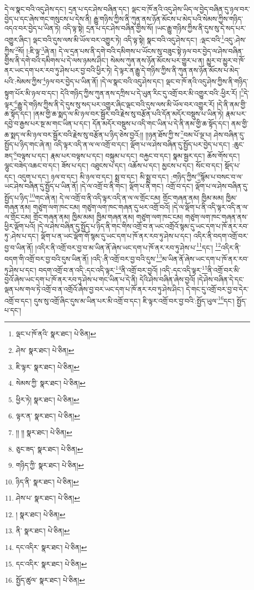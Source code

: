 དེ་ལ་སྣང་བའི་འདུ་ཤེས་དང་། དྲན་པ་དང་ཤེས་བཞིན་དང་། ལྡང་བ་ཁོ་ནའི་འདུ་ཤེས་ཡིད་ལ་བྱེད་བཞིན་དུ་ཉལ་བར་བྱེད་པ་དང་ཞེས་གང་གསུངས་པ་དེས་ནི། རྒྱུ་གཉིས་ཀྱིས་ནི་ཀུན་ནས་ཉོན་མོངས་པ་མེད་པའི་སེམས་ཀྱིས་གཉིད་འདའ་བར་བྱེད་པ་ཡིན་ཏེ། འདི་ལྟ་སྟེ། དྲན་པ་དང་ཤེས་བཞིན་གྱིས་སོ། །ཡང་རྒྱུ་གཉིས་ཀྱིས་ནི་དུས་སུ་དེ་སད་པར་འགྱུར་ཞིང་། ལྡང་བའི་དུས་ལས་མི་ཡོལ་བར་འགྱུར་ཏེ། འདི་ལྟ་སྟེ། སྣང་བའི་འདུ་ཤེས་དང་། :ལྡང་བའི་\footnote{ལྡང་པ་ཁོ་ནའི་  སྣར་ཐང་།  པེ་ཅིན། }འདུ་:ཤེས་ཀྱིས་\footnote{ཤེས་  སྣར་ཐང་།  པེ་ཅིན། }སོ། །:ཇི་ལྟ་\footnote{ཇི་ལྟར་  སྣར་ཐང་།  པེ་ཅིན། }ཞེ་ན། དེ་ལ་དྲན་པས་ནི་དགེ་བའི་དམིགས་པ་ཡོངས་སུ་བཟུང་སྟེ་ཉལ་བར་བྱེད་ལ་ཤེས་བཞིན་གྱིས་ནི་དགེ་བའི་དམིགས་པ་དེ་ལས་ཉམས་ཤིང་། སེམས་ཀུན་ནས་ཉོན་མོངས་པར་གྱུར་པ་ན། མྱུར་བ་མྱུར་བ་ཁོ་ནར་ཡང་དག་པར་རབ་ཏུ་ཤེས་པར་བྱ་བའི་ཕྱིར་ཏེ། དེ་ལྟར་ན་རྒྱུ་དེ་གཉིས་ཀྱིས་ནི་ཀུན་ནས་ཉོན་མོངས་པ་མེད་པའི་:སེམས་ཀྱིས་\footnote{སེམས་ཀྱི་  སྣར་ཐང་།  པེ་ཅིན། }ཉལ་བར་བྱེད་པ་ཡིན་ནོ། །དེ་ལ་སྣང་བའི་འདུ་ཤེས་དང་། ལྡང་བ་ཁོ་ནའི་འདུ་ཤེས་ཀྱིས་ནི་གཉིད་སྟུག་པོར་མི་ཉལ་བ་དང་། དེའི་གཉིད་ཀྱིས་ཀུན་ནས་དཀྲིས་པ་དེ་ཡུན་རིང་དུ་འགྲོ་བར་མི་འགྱུར་བའི་:ཕྱིར་རོ། །\footnote{ཕྱིར་ཏེ།   སྣར་ཐང་།  པེ་ཅིན། }དེ་ལྟར་\footnote{ལྟར་ན་  སྣར་ཐང་།  པེ་ཅིན། }རྒྱུ་དེ་གཉིས་ཀྱིས་ནི་དེ་དུས་སུ་སད་པར་འགྱུར་ཞིང་ལྡང་བའི་དུས་ལས་མི་ཡོལ་བར་འགྱུར་རོ། །དེ་ནི་ནམ་གྱི་ཆ་སྟོད་དང་། །ནམ་གྱི་ཆ་སྨད་ལ་མི་ཉལ་བར་སྦྱོར་བའི་རྗེས་སུ་བརྩོན་པའི་དོན་མདོར་བསྡུས་པ་ཡིན་ཏེ། རྣམ་པར་དབྱེ་བ་རྒྱས་པར་སྔ་མ་གང་ཡིན་པ་དང་། དོན་མདོར་བསྡུས་པ་འདི་གང་ཡིན་པ་དེ་ནི་ནམ་གྱི་ཆ་སྟོད་དང་། ནམ་གྱི་ཆ་སྨད་ལ་མི་ཉལ་བར་སྦྱོར་བའི་རྗེས་སུ་བརྩོན་པ་ཉིད་ཅེས་བྱའོ:།། །།ཉན་ཐོས་ཀྱི་ས་\footnote{།། །།  སྣར་ཐང་།  པེ་ཅིན། }བམ་པོ་ལྔ་པ། ཤེས་བཞིན་དུ་སྤྱོད་པ་ཉིད་གང་ཞེ་ན། འདི་ལྟར་འདི་ན་ལ་ལ་འགྲོ་བ་དང་། ལྡོག་པ་ལ་ཤེས་བཞིན་དུ་སྤྱོད་པར་བྱེད་པ་དང་། :ཆུང་ཟད་\footnote{ཅུང་ཟད་  སྣར་ཐང་།  པེ་ཅིན། }བལྟས་པ་དང་། རྣམ་པར་བལྟས་པ་དང་། བསྐུམ་པ་དང་། བརྐྱང་བ་དང་། སྣམ་སྦྱར་དང་། ཆོས་གོས་དང་། ལྷུང་བཟེད་འཆང་བ་དང་། ཟོས་པ་དང་། འཐུངས་པ་དང་། འཆོས་པ་དང་། མྱངས་པ་དང་། སོང་བ་དང་། སྡོད་པ་དང་། འདུག་པ་དང་། ཉལ་བ་དང་། མི་ཉལ་བ་དང་། སྨྲ་བ་དང་། མི་སྨྲ་བ་དང་། :གཉིད་ཀྱིས་\footnote{གཉིད་ཀྱི་  སྣར་ཐང་།  པེ་ཅིན། }སྙོམ་པ་བསང་བ་ལ་ཡང་ཤེས་བཞིན་དུ་སྤྱོད་པ་ཡིན་ནོ། །དེ་ལ་འགྲོ་བ་ནི་གང་། ལྡོག་པ་ནི་གང་། འགྲོ་བ་དང་། ལྡོག་པ་ལ་ཤེས་བཞིན་དུ་སྤྱོད་པ་ཉིད་\footnote{ཉིད་ནི་  སྣར་ཐང་།  པེ་ཅིན། }གང་ཞེ་ན། དེ་ལ་འགྲོ་བ་ནི་འདི་ལྟར་འདི་ན་ལ་ལ་གྲོང་ངམ། གྲོང་གཞན་ནམ། ཁྱིམ་མམ། ཁྱིམ་གཞན་ནམ། གཙུག་ལག་ཁང་ངམ། གཙུག་ལག་ཁང་གཞན་དུ་ཕར་འགྲོ་བའོ། །དེ་ལ་ལྡོག་པ་ནི་འདི་ལྟར་འདི་ན་ལ་ལ་གྲོང་ངམ། གྲོང་གཞན་ནམ། ཁྱིམ་མམ། ཁྱིམ་གཞན་ནམ། གཙུག་ལག་ཁང་ངམ། གཙུག་ལག་ཁང་གཞན་ནས་ཕྱིར་ལྡོག་པའོ། །དེ་ལ་ཤེས་བཞིན་དུ་སྤྱོད་པ་ཉིད་ནི་གང་གིས་འགྲོ་བ་ན་ཡང་འགྲོའོ་སྙམ་དུ་ཡང་དག་པ་ཁོ་ནར་རབ་ཏུ་:ཤེས་པ་དང་། ལྡོག་པ་ན་ཡང་ལྡོག་གོ་སྙམ་དུ་ཡང་དག་པ་ཁོ་ནར་རབ་ཏུ་ཤེས་པ་དང་། འདིར་ནི་བདག་འགྲོ་བར་བྱ་བ་ཡིན་ནོ། །འདིར་ནི་འགྲོ་བར་བྱ་བ་མ་ཡིན་ནོ་ཞེས་ཡང་དག་པ་ཁོ་ནར་རབ་ཏུ་ཤེས་པ་\footnote{ཤེས་པ་  སྣར་ཐང་།  པེ་ཅིན། }དང་། \footnote{།    སྣར་ཐང་།  པེ་ཅིན། }འདིར་ནི་བདག་གི་འགྲོ་བར་བྱ་བའི་དུས་ཡིན་ནོ། །འདི་:ནི་འགྲོ་བར་བྱ་བའི་དུས་\footnote{ནི་  སྣར་ཐང་།  པེ་ཅིན། }མ་ཡིན་ནོ་ཞེས་ཡང་དག་པ་ཁོ་ནར་རབ་ཏུ་ཤེས་པ་དང་། བདག་འགྲོ་བ་ན་འདི་:དང་འདི་ལྟར་\footnote{དང་འདིར་  སྣར་ཐང་།  པེ་ཅིན། }ནི་འགྲོ་བར་བྱའོ། །འདི་:དང་འདི་ལྟར་\footnote{དང་འདིར་  སྣར་ཐང་།  པེ་ཅིན། }ནི་འགྲོ་བར་མི་བྱའོ་ཞེས་ཡང་དག་པ་ཁོ་ནར་རབ་ཏུ་ཤེས་པ་གང་ཡིན་པ་དེ་ནི། དེའི་ཤེས་བཞིན་ཞེས་བྱའོ། །དེ་ཤེས་བཞིན་དེ་དང་ལྡན་པས་གལ་ཏེ་འགྲོ་བ་ན་འགྲོའོ་ཞེས་བྱ་བར་ཡང་དག་པ་ཁོ་ནར་རབ་ཏུ་ཤེས་ཤིང་། དེ་གང་དུ་འགྲོ་བར་བྱ་བ་དེར་འགྲོ་བ་དང་། དུས་སུ་འགྲོ་ཞིང་དུས་མ་ཡིན་པར་མི་འགྲོ་བ་དང་། ཇི་ལྟར་འགྲོ་བར་བྱ་བའི་:སྤྱོད་ཡུལ་\footnote{སྤྱོད་ཚུལ་  སྣར་ཐང་།  པེ་ཅིན། }དང་། སྤྱོད་པ་དང་། 